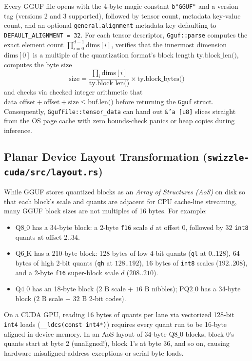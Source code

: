 \documentclass[10pt,a4paper]{article}
\theoremstyle{swzstyle}
\newcommand{\code}[1]{\texttt{#1}}
\begin{document}
Every GGUF file opens with the 4-byte magic constant \code{b"GGUF"} and a version tag (versions 2 and 3 supported), followed by tensor count, metadata key-value count, and an optional \code{general.alignment} metadata key defaulting to \code{DEFAULT\_ALIGNMENT = 32}. For each tensor descriptor, \code{Gguf::parse} computes the exact element count $\prod_{i=0}^{d-1} \text{dims}[i]$, verifies that the innermost dimension $\text{dims}[0]$ is a multiple of the quantization format's block length $\text{ty.block\_len()}$, computes the byte size
\begin{equation}
  \text{size} = \frac{\prod_{i} \text{dims}[i]}{\text{ty.block\_len()}} \times \text{ty.block\_bytes()}
\end{equation}
and checks via checked integer arithmetic that $\text{data\_offset} + \text{offset} + \text{size} \le \text{buf.len()}$ before returning the \code{Gguf} struct. Consequently, \code{GgufFile::tensor\_data} can hand out \code{\&'a [u8]} slices straight from the OS page cache with zero bounds-check panics or heap copies during inference.

\subsection{Planar Device Layout Transformation (\texttt{swizzle-cuda/src/layout.rs})}

While GGUF stores quantized blocks as an \emph{Array of Structures (AoS)} on disk so that each block's scale and quants are adjacent for CPU cache-line streaming, many GGUF block sizes are not multiples of 16 bytes. For example:
\begin{itemize}
  \item $\text{Q8\_0}$ has a 34-byte block: a 2-byte \code{f16} scale $d$ at offset $0$, followed by 32 \code{int8} quants at offset $2..34$.
  \item $\text{Q6\_K}$ has a 210-byte block: 128 bytes of low 4-bit quants (\code{ql} at $0..128$), 64 bytes of high 2-bit quants (\code{qh} at $128..192$), 16 bytes of \code{int8} scales ($192..208$), and a 2-byte \code{f16} super-block scale $d$ ($208..210$).
  \item $\text{Q4\_0}$ has an 18-byte block ($2\text{ B}$ scale + $16\text{ B}$ nibbles); $\text{PQ2\_0}$ has a 34-byte block ($2\text{ B}$ scale + $32\text{ B}$ 2-bit codes).
\end{itemize}

On a CUDA GPU, reading 16 bytes of quants per lane via vectorized 128-bit \code{int4} loads (\code{\_\_ldcs(const int4*)}) requires every quant run to be 16-byte aligned in device memory. In an AoS layout of 34-byte $\text{Q8\_0}$ blocks, block 0's quants start at byte 2 (unaligned!), block 1's at byte 36, and so on, causing hardware misaligned-address exceptions or serial byte loads.
\end{document}
